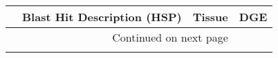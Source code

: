 \begin{longtable}{llll}
\toprule
{} &                                                                                                                                                                                                                                                                                                                                                                                                                                                                                                                                                      Blast Hit Description (HSP) & Tissue & DGE \\
\midrule
\endhead
\midrule
\multicolumn{3}{r}{{Continued on next page}} \\
\midrule
\endfoot


\end{longtable}
